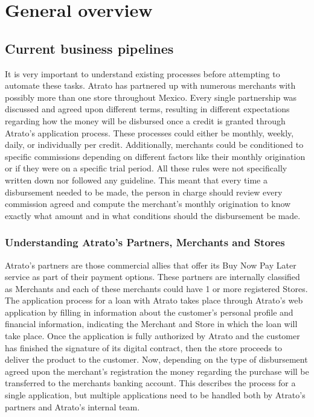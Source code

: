\chapter{General overview}


\section{Current business pipelines}

It is very important to understand existing processes before attempting to automate these tasks. Atrato has partnered up with numerous merchants with possibly more than one store throughout Mexico. Every single partnership was discussed and agreed upon different terms, resulting in different expectations regarding how the money will be disbursed once a credit is granted through Atrato’s application process. These processes could either be monthly, weekly, daily, or individually per credit. Additionally, merchants could be conditioned to specific commissions depending on different factors like their monthly origination or if they were on a specific trial period. All these rules were not specifically written down nor followed any guideline. This meant that every time a disbursement needed to be made, the person in charge should review every commission agreed and compute the merchant’s monthly origination to know exactly what amount and in what conditions should the disbursement be made.

\subsection{Understanding Atrato’s Partners, Merchants and Stores}

Atrato’s partners are those commercial allies that offer its Buy Now Pay Later service as part of their payment options. These partners are internally classified as Merchants and each of these merchants could have 1 or more registered Stores.\\

The application process for a loan with Atrato takes place through Atrato’s web application by filling in information about the customer’s personal profile and financial information, indicating the Merchant and Store in which the loan will take place. Once the application is fully authorized by Atrato and the customer has finished the signature of its digital contract, then the store proceeds to deliver the product to the customer. Now, depending on the type of disbursement agreed upon the merchant’s registration the money regarding the purchase will be transferred to the merchants banking account. This describes the process for a single application, but multiple applications need to be handled both by Atrato’s partners and Atrato’s internal team.

